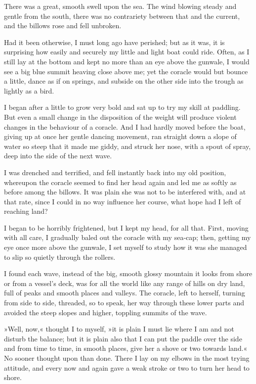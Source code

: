 There was a great, smooth swell upon the sea. The wind blowing steady and gentle from the south, there was no contrariety between that and the current, and the billows rose and fell unbroken.

Had it been otherwise, I must long ago have perished; but as it was, it is surprising how easily and securely my little and light boat could ride. Often, as I still lay at the bottom and kept no more than an eye above the gunwale, I would see a big blue summit heaving close above me; yet the coracle would but bounce a little, dance as if on springs, and subside on the other side into the trough as lightly as a bird.

I began after a little to grow very bold and sat up to try my skill at paddling. But even a small change in the disposition of the weight will produce violent changes in the behaviour of a coracle. And I had hardly moved before the boat, giving up at once her gentle dancing movement, ran straight down a slope of water so steep that it made me giddy, and struck her nose, with a spout of spray, deep into the side of the next wave.

I was drenched and terrified, and fell instantly back into my old position, whereupon the coracle seemed to find her head again and led me as softly as before among the billows. It was plain she was not to be interfered with, and at that rate, since I could in no way influence her course, what hope had I left of reaching land?

I began to be horribly frightened, but I kept my head, for all that. First, moving with all care, I gradually baled out the coracle with my sea-cap; then, getting my eye once more above the gunwale, I set myself to study how it was she managed to slip so quietly through the rollers.

I found each wave, instead of the big, smooth glossy mountain it looks from shore or from a vessel's deck, was for all the world like any range of hills on dry land, full of peaks and smooth places and valleys. The coracle, left to herself, turning from side to side, threaded, so to speak, her way through these lower parts and avoided the steep slopes and higher, toppling summits of the wave.

»Well, now,« thought I to myself, »it is plain I must lie where I am and not disturb the balance; but it is plain also that I can put the paddle over the side and from time to time, in smooth places, give her a shove or two towards land.« No sooner thought upon than done. There I lay on my elbows in the most trying attitude, and every now and again gave a weak stroke or two to turn her head to shore.

